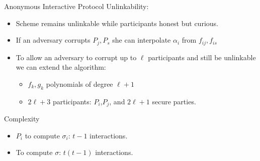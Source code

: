 \begin{frame}{Anonymous Interactive Protocol}
Unlinkability:
\begin{itemize}
\item Scheme remains unlinkable while participants honest but curious.
\item If an adversary corrupts $P_j, P_s$ she can interpolate $\alpha_i$ from $f_{ij},f_{is}$
\item To allow an adversary to corrupt up to $\ell$ participants and still be unlinkable we can extend the algorithm:
\begin{itemize}
\item $f_k,g_k$ polynomials of degree $\ell+1$
\item $2 \ell + 3$ participants: $P_i$,$P_j$, and $2\ell+1$ secure parties.
\end{itemize}
\end{itemize}
Complexity
\begin{itemize}
\item $P_i$ to compute $\sigma_i$: $t-1$ interactions.
\item To compute $\sigma$: $t(t-1)$ interactions.
\end{itemize}
\end{frame}